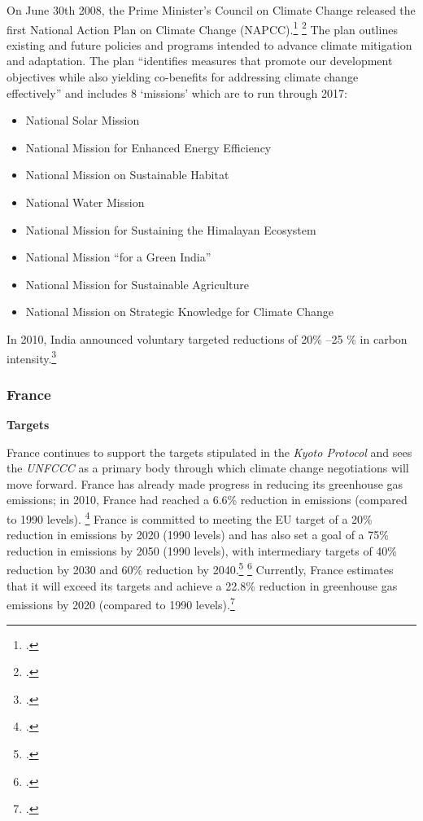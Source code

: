 On June 30th 2008, the Prime Minister's Council on Climate Change released the first National Action Plan on Climate Change (NAPCC).\footcite[][]{IndiaPlan2008} \footcite[See also: ][]{IndiaActionSummary}
The plan outlines existing and future policies and programs intended to advance climate mitigation and adaptation. 
The plan ``identifies measures that promote our development objectives while also yielding co-benefits for addressing climate change effectively'' and includes 8 `missions' which are to run through 2017:
\begin{itemize}
	\item National Solar Mission 
	\item National Mission for Enhanced Energy Efficiency
	\item National Mission on Sustainable Habitat
	\item National Water Mission
	\item National Mission for Sustaining the Himalayan Ecosystem
	\item National Mission “for a Green India”
	\item National Mission for Sustainable Agriculture
	\item National Mission on Strategic Knowledge for Climate Change
\end{itemize}



In 2010, India announced voluntary targeted reductions of 20\% --25 \% in carbon intensity.\footcite[][p. 108]{UNHumanDev2013}



	\subsubsection{France}
	


\textbf{Targets}



France continues to support the targets stipulated in the \emph{Kyoto Protocol} and sees the \emph{UNFCCC} as a primary body through which climate change negotiations will move forward. 
France has already made progress in reducing its greenhouse gas emissions; in 2010, France had reached a 6.6\% reduction in emissions (compared to 1990 levels). \footcite[][]{FranceEmission}
France is committed to meeting the EU target of a 20\% reduction in emissions by 2020 (1990 levels) and has also set a goal of a 75\% reduction in emissions by 2050 (1990 levels), with intermediary targets of 40\% reduction by 2030 and 60\% reduction by 2040.\footcite[][]{Reduction2050} \footcite[][]{IntermediaryTargets}
Currently, France estimates that it will exceed its targets and achieve a 22.8\% reduction in greenhouse gas emissions by 2020 (compared to 1990 levels).\footcite[][]{Reduction2020}



